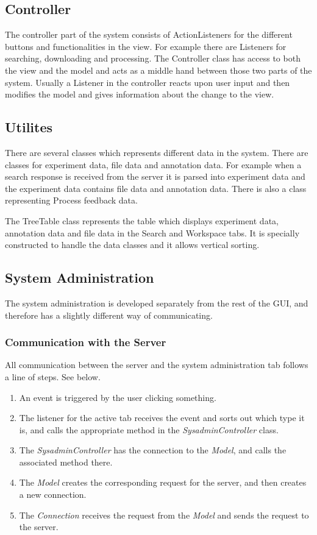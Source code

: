 \subsection{Controller}
The controller part of the system consists of ActionListeners for the different buttons and functionalities in the view. For example there are Listeners for searching, downloading and processing. The Controller class has access to both the view and the model and acts as a middle hand between those two parts of the system. Usually a Listener in the controller reacts upon user input and then modifies the model and gives information about the change to the view.


\subsection{Utilites}

There are several classes which represents different data in the system. There are classes for experiment data, file data and annotation data. For example when a search response is received from the server it is parsed into experiment data and the experiment data contains file data and annotation data. There is also a class representing Process feedback data.

The TreeTable class represents the table which displays experiment data, annotation data and file data in the Search and Workspace tabs. It is specially constructed to handle the data classes and it allows vertical sorting.

\subsection{System Administration}
The system administration is developed separately from the rest of the GUI, and therefore has a slightly different way of communicating.

\subsubsection{Communication with the Server}
\label{Communication with the Server}

All communication between the server and the system administration tab follows a line of steps. See  below.

\begin{enumerate}
  \item An event is triggered by the user clicking something.
  \item The listener for the active tab receives the event and sorts out which type it is, and calls the appropriate method in the \textit{SysadminController} class.
  \item The \textit{SysadminController} has the connection to the \textit{Model}, and calls the associated method there.
  \item The \textit{Model} creates the corresponding request for the server, and then creates a new connection.
  \item The \textit{Connection} receives the request from the \textit{Model} and sends the request to the server.
\end{enumerate}

